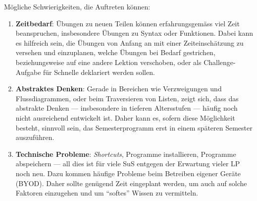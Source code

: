 Mögliche Schwierigkeiten, die Auftreten können:
\begin{enumerate}
\item \textbf{Zeitbedarf}: Übungen zu neuen Teilen können erfahrungsgemäss viel Zeit beanspruchen, insbesondere Übungen zu Syntax oder Funktionen. Dabei kann es hilfreich sein, die Übungen von Anfang an mit einer Zeiteinschätzung zu versehen und einzuplanen, welche Übungen bei Bedarf gestrichen, beziehungsweise auf eine andere Lektion verschoben, oder als Challenge-Aufgabe für Schnelle deklariert werden sollen.
\item \textbf{Abstraktes Denken}: Gerade in Bereichen wie Verzweigungen und Flussdiagrammen, oder beim Traversieren von Listen, zeigt sich, dass das abstrakte Denken --- insbesondere in tieferen Altersstufen --- häufig noch nicht ausreichend entwickelt ist. Daher kann es, sofern diese Möglichkeit besteht, sinnvoll sein, das Semesterprogramm erst in einem späteren Semester auszuführen.
\item \textbf{Technische Probleme}: \textit{Shortcuts}, Programme installieren, Programme abspeichern --- all dies ist für viele SuS entgegen der Erwartung vieler LP noch neu. Dazu kommen häufige Probleme beim Betreiben eigener Geräte (BYOD). Daher sollte genügend Zeit eingeplant werden, um auch auf solche Faktoren einzugehen und um ``softes'' Wissen zu vermitteln.
\end{enumerate}

\clearpage
\tableofcontents
\clearpage
